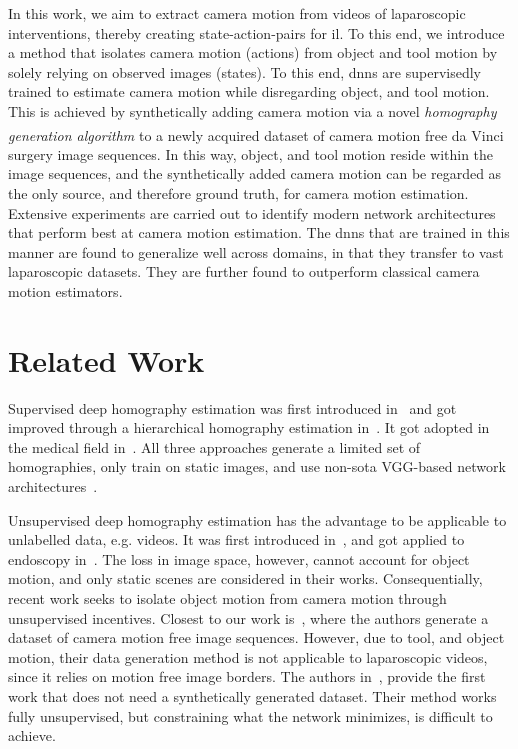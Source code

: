 In this work, we aim to extract camera motion from videos of laparoscopic interventions, thereby creating state-action-pairs for \gls{il}. To this end, we introduce a method that isolates camera motion (actions) from object and tool motion by solely relying on observed images (states). To this end, \gls{dnn}s are supervisedly trained to estimate camera motion while disregarding object, and tool motion. This is achieved by synthetically adding camera motion via a novel \textit{homography generation algorithm} to a newly acquired dataset of camera motion free da Vinci\textsuperscript{\textregistered} surgery image sequences. In this way, object, and tool motion reside within the image sequences, and the synthetically added camera motion can be regarded as the only source, and therefore ground truth, for camera motion estimation. Extensive experiments are carried out to identify modern network architectures that perform best at camera motion estimation. The \gls{dnn}s that are trained in this manner are found to generalize well across domains, in that they transfer to vast laparoscopic datasets. They are further found to outperform classical camera motion estimators.

\section{Related Work}

Supervised deep homography estimation was first introduced in~\cite{detone2016deep} and got improved through a hierarchical homography estimation in~\cite{erlik2017homography}. It got adopted in the medical field in~\cite{bano2020deep}. All three approaches generate a limited set of homographies, only train on static images, and use non-\gls{sota} VGG-based network architectures~\cite{simonyan2014very}.

Unsupervised deep homography estimation has the advantage to be applicable to unlabelled data, e.g. videos. It was first introduced in~\cite{nguyen2018unsupervised}, and got applied to endoscopy in~\cite{gomes2019unsupervised}. The loss in image space, however, cannot account for object motion, and only static scenes are considered in their works. Consequentially, recent work seeks to isolate object motion from camera motion through unsupervised incentives. Closest to our work is~\cite{le2020deep}, where the authors generate a dataset of camera motion free image sequences. However, due to tool, and object motion, their data generation method is not applicable to laparoscopic videos, since it relies on motion free image borders. The authors in~\cite{zhang2019content}, provide the first work that does not need a synthetically generated dataset. Their method works fully unsupervised, but constraining what the network minimizes, is difficult to achieve.

